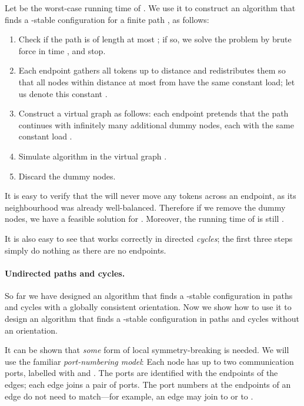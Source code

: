 Let  be the worst-case running time of . We use it to construct an algorithm  that finds a -stable configuration for a finite path , as follows:
\begin{enumerate}
    \item Check if the path is of length at most ; if so, we solve the problem by brute force in time , and stop.
    \item Each endpoint  gathers all tokens up to distance  and redistributes them so that all nodes within distance at most  from  have the same constant load; let us denote this constant .
    \item Construct a virtual graph  as follows: each endpoint  pretends that the path continues with infinitely many additional dummy nodes, each with the same constant load .
    \item Simulate algorithm  in the virtual graph .
    \item Discard the dummy nodes.
\end{enumerate}
It is easy to verify that the  will never move any tokens across an endpoint, as its neighbourhood was already well-balanced. Therefore if we remove the dummy nodes, we have a feasible solution for . Moreover, the running time of  is still .

It is also easy to see that  works correctly in directed \emph{cycles}; the first three steps simply do nothing as there are no endpoints.


\paragraph{Undirected paths and cycles.}

So far we have designed an algorithm  that finds a -stable configuration in paths and cycles with a globally consistent orientation. Now we show how to use it to design an algorithm  that finds a -stable configuration in paths and cycles without an orientation.

It can be shown that \emph{some} form of local symmetry-breaking is needed. We will use the familiar \emph{port-numbering model}: Each node  has up to two communication ports, labelled with  and . The ports are identified with the endpoints of the edges; each edge joins a pair of ports. The port numbers at the endpoints of an edge do not need to match---for example, an edge  may join  to  or  to .


